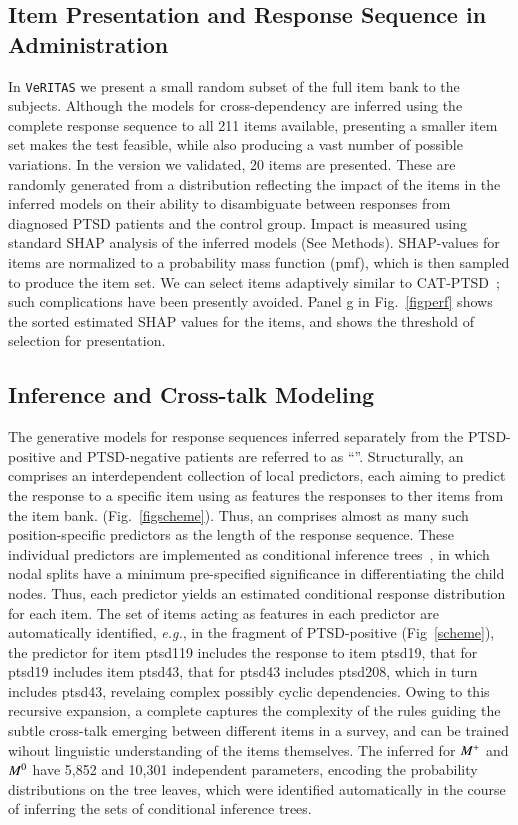 \documentclass[onecolumn,10pt]{IEEEtran}
\def\Methods{Online Methods}
\def\Methods{Methods\xspace}
\def\vrts{\texttt{VeRITAS}\xspace}
\begin{document}
\subsection*{Item Presentation and Response Sequence in Administration}
In \vrts we present  a small random subset of the full item bank to the subjects. Although the models for cross-dependency are inferred using the complete response sequence to all 211 items available, presenting a smaller  item set makes the test feasible, while also producing a vast number of possible variations. In the version we validated, 20 items are presented. These are randomly generated from a distribution reflecting the  impact  of the items in the inferred models on their ability to disambiguate between responses from diagnosed PTSD patients and the control group. Impact is measured using standard SHAP analysis of the inferred models (See \Methods). SHAP-values for items are normalized to a probability mass function (pmf), which is then sampled  to produce the item set. We can select items adaptively similar to CAT-PTSD~\cite{brenner2021development}; such  complications have been presently avoided. Panel g in Fig.~\ref{figperf} shows the sorted estimated SHAP values for the items, and shows the threshold of selection for presentation. 

\subsection*{\qnet Inference and Cross-talk Modeling}
The generative models for response sequences inferred separately from the PTSD-positive and PTSD-negative patients are referred to as ``''. Structurally, an \qnet comprises an interdependent collection of  local predictors, each aiming to predict the  response to a specific item using as features  the responses to ther items from the item bank.     (Fig.~\ref{figscheme}). Thus,  an \qnet comprises almost as many such  position-specific predictors as the length of the response sequence. These individual predictors are implemented as conditional inference trees~\cite{Hothorn06unbiasedrecursive}, in which  nodal splits  have  a minimum pre-specified significance in differentiating the  child nodes. Thus, each predictor yields an estimated conditional response distribution  for each item. The set of items acting as features in each predictor are automatically identified, \textit{e.g.}, in the fragment of PTSD-positive  \qnet (Fig~\ref{scheme}), the predictor for item ptsd119 includes the response to item ptsd19, that for ptsd19 includes item ptsd43, that for ptsd43 includes ptsd208, which in turn includes ptsd43, revelaing complex possibly cyclic dependencies. Owing to this recursive expansion,  a complete \qnet  captures the complexity of the rules guiding the subtle cross-talk emerging between different items in a survey, and can be trained wihout linguistic understanding of the items themselves. The  inferred for $M^+$ and $M^0$ have 5,852 and  10,301 independent parameters, encoding the probability distributions on the tree leaves,  which were identified automatically in the course of inferring the sets of conditional inference trees.
\end{document}
